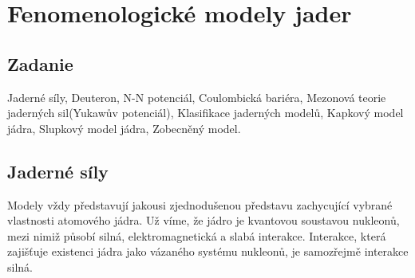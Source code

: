 \documentclass[../../main.tex]{subfiles}
\begin{document}
\chapter{Fenomenologické modely jader}

\section{Zadanie}

Jaderné síly, Deuteron, N-N potenciál, Coulombická bariéra, Mezonová teorie jaderných sil(Yukawův potenciál), Klasifikace jaderných modelů, Kapkový model jádra, Slupkový model jádra, Zobecněný model.

\section{Jaderné síly}

Modely vždy představují jakousi zjednodušenou představu zachycující vybrané vlastnosti atomového jádra. Už víme, že jádro je kvantovou soustavou nukleonů, mezi nimiž působí silná, elektromagnetická a slabá interakce. Interakce, která zajišťuje existenci jádra jako vázaného systému nukleonů, je samozřejmě interakce silná.
\end{document}
